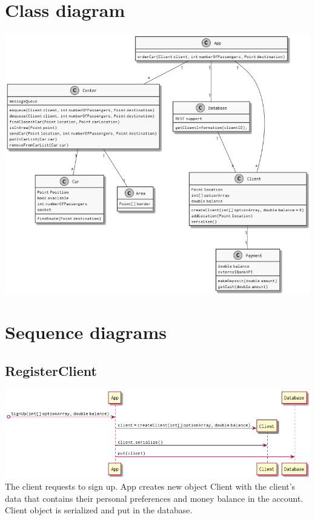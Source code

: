 \documentclass[a4paper]{article}
\begin{document}
\section*{Class diagram}
\includegraphics[width=1\textwidth]{../Diagrams/classDiagram.png}

\section*{Sequence diagrams}
\subsection*{RegisterClient}
\includegraphics[width=1\textwidth]{../Diagrams/registerClient.png}\\
The client requests to sign up. App creates new object Client with the client's data that contains their personal preferences and money balance in the account. Client object is serialized and put in the database.
\end{document}
